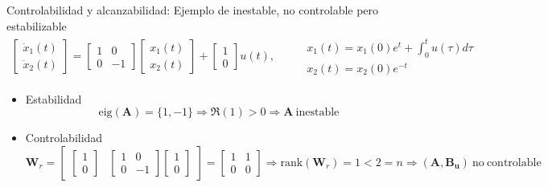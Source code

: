 \documentclass{beamer}
\begin{document}
\begin{frame}{Controlabilidad y alcanzabilidad: Ejemplo de inestable, no controlable pero estabilizable}
    $$
    \begin{matrix}
    \begin{bmatrix}
        \dot{x}_1(t) \\
        \dot{x}_2(t)
    \end{bmatrix}
    =
    \begin{bmatrix}
        1 & 0 \\
        0 & -1
    \end{bmatrix}
    \begin{bmatrix}
        x_1(t) \\
        x_2(t)
    \end{bmatrix}
    +
    \begin{bmatrix}
        1 \\
        0
    \end{bmatrix}
    u(t), & &
    \begin{aligned}
        &x_1(t) = x_1(0) e^t + \int_0^t{u(\tau)d\tau} \\
        &x_2(t) = x_2(0) e^{-t}
    \end{aligned}
    \end{matrix}
    $$
    
    \begin{itemize}
        \item Estabilidad
        $$\mathrm{eig}(\mathbf{A}) = \{1, -1\}
        \Rightarrow \Re(1) > 0 \Rightarrow \mathbf{A}  ~\mathrm{inestable}$$

        \item Controlabilidad
        $$\mathbf{W}_r = \begin{bmatrix}
            \begin{bmatrix}
                1 \\
                0
            \end{bmatrix}
            &
            \begin{bmatrix}
                1 & 0 \\
                0 & -1
            \end{bmatrix}
            \begin{bmatrix}
                1 \\
                0
            \end{bmatrix}
        \end{bmatrix}
        =
        \begin{bmatrix}
            1 & 1 \\
            0 & 0
        \end{bmatrix}
        \Rightarrow
        \mathrm{rank}(\mathbf{W}_r)=1<2=n
        \Rightarrow
        (\mathbf{A}, \mathbf{B_u})~\mathrm{no~controlable}
        $$


\end{itemize}
\end{frame}
\end{document}

